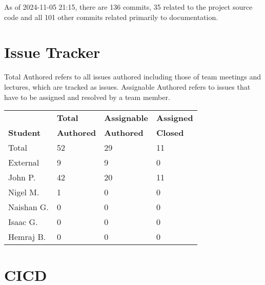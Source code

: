 \documentclass{article}
\begin{document}

As of 2024-11-05 21:15, there are 136 commits, 35 related to the project source code and all 101 other commits related primarily to documentation.

\section{Issue Tracker}


Total Authored refers to all issues authored including those of team meetings and lectures, which are tracked as issues. Assignable Authored refers to issues that have to be assigned and resolved by a team member.

\begin{table}[H]
\centering
\begin{tabular}{llll}
\toprule
\textbf{ } & \textbf{Total} & \textbf{Assignable} & \textbf{Assigned}\\
\textbf{Student} & \textbf{Authored} & \textbf{Authored} & \textbf{Closed}\\
\midrule
Total & 52 & 29 & 11 \\
\midrule
External & 9 & 9 & 0 \\
John P. & 42 & 20 & 11 \\
Nigel M. & 1 & 0 & 0 \\
Naishan G. & 0 & 0 & 0 \\
Isaac G. & 0 & 0 & 0 \\
Hemraj B. & 0 & 0 & 0 \\
\bottomrule
\end{tabular}
\end{table}





\section{CICD}


\end{document}
